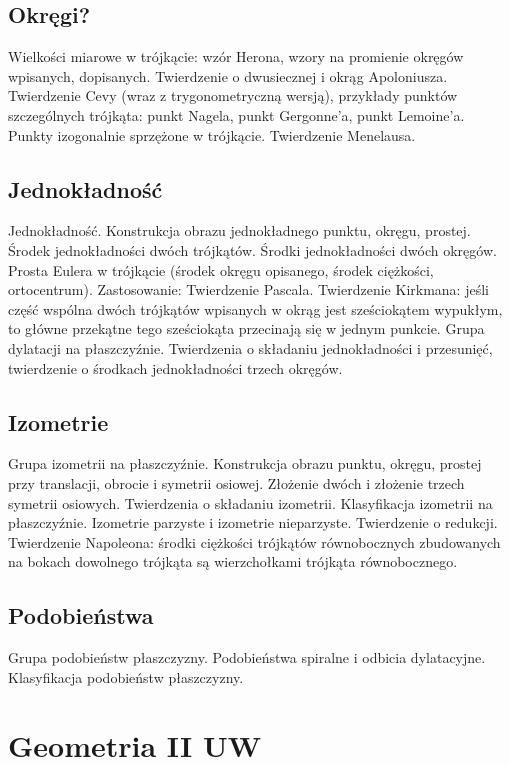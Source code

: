 \documentclass{LegrandOrangeBook}
\begin{document}
\section{Okręgi?}
Wielkości miarowe w trójkącie: wzór Herona, wzory na promienie okręgów wpisanych, dopisanych.
Twierdzenie o dwusiecznej i okrąg Apoloniusza.
Twierdzenie Cevy (wraz z trygonometryczną wersją), przykłady punktów szczególnych trójkąta: punkt Nagela, punkt Gergonne'a, punkt Lemoine'a.
Punkty izogonalnie sprzężone w trójkącie.
Twierdzenie Menelausa.

\section{Jednokładność}
Jednokładność.
Konstrukcja obrazu jednokładnego punktu, okręgu, prostej.
Środek jednokładności dwóch trójkątów.
Środki jednokładności dwóch okręgów.
Prosta Eulera w trójkącie (środek okręgu opisanego, środek ciężkości, ortocentrum).
Zastosowanie: Twierdzenie Pascala.
Twierdzenie Kirkmana: jeśli część wspólna dwóch trójkątów wpisanych w okrąg jest sześciokątem wypukłym, to główne przekątne tego sześciokąta przecinają się w jednym punkcie.
Grupa dylatacji na płaszczyźnie.
Twierdzenia o składaniu jednokładności i przesunięć, twierdzenie o środkach jednokładności trzech okręgów.

\section{Izometrie}
Grupa izometrii na płaszczyźnie.
Konstrukcja obrazu punktu, okręgu, prostej przy translacji, obrocie i symetrii osiowej.
Złożenie dwóch i złożenie trzech symetrii osiowych.
Twierdzenia o składaniu izometrii.
Klasyfikacja izometrii na płaszczyźnie.
Izometrie parzyste i izometrie nieparzyste.
Twierdzenie o redukcji.
Twierdzenie Napoleona: środki ciężkości trójkątów równobocznych zbudowanych na bokach dowolnego trójkąta są wierzchołkami trójkąta równobocznego.

\section{Podobieństwa}
Grupa podobieństw płaszczyzny.
Podobieństwa spiralne i odbicia dylatacyjne.
Klasyfikacja podobieństw płaszczyzny.


\chapter{Geometria II UW}
\end{document}
